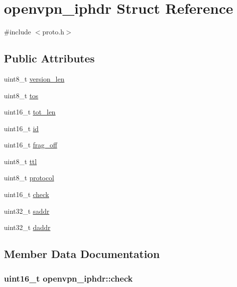 \hypertarget{structopenvpn__iphdr}{}\section{openvpn\+\_\+iphdr Struct Reference}
\label{structopenvpn__iphdr}


{\ttfamily \#include $<$proto.\+h$>$}

\subsection*{Public Attributes}
\begin{DoxyCompactItemize}
\item 
uint8\+\_\+t \hyperlink{structopenvpn__iphdr_af3c74339e4e6ab5c8edbb5b8d1ab3fa6}{version\+\_\+len}
\item 
uint8\+\_\+t \hyperlink{structopenvpn__iphdr_a7d9f9091a70b79f109b955d1847f0cdd}{tos}
\item 
uint16\+\_\+t \hyperlink{structopenvpn__iphdr_a85f8dfbea42552b0b223ea33e631e00f}{tot\+\_\+len}
\item 
uint16\+\_\+t \hyperlink{structopenvpn__iphdr_a6194466018f8cb66d48d5cf24f10eafc}{id}
\item 
uint16\+\_\+t \hyperlink{structopenvpn__iphdr_a16d58a2f6f08ba155fbcfe917481f24b}{frag\+\_\+off}
\item 
uint8\+\_\+t \hyperlink{structopenvpn__iphdr_ac44b0a0f71994e78650cd99ef5fff6f4}{ttl}
\item 
uint8\+\_\+t \hyperlink{structopenvpn__iphdr_a80991f47f7829586d8f04ab15e32887b}{protocol}
\item 
uint16\+\_\+t \hyperlink{structopenvpn__iphdr_aaf20d2d6bbc29e93131ec46435339618}{check}
\item 
uint32\+\_\+t \hyperlink{structopenvpn__iphdr_a0fc77e795ef1ceba80104f1b75c89e40}{saddr}
\item 
uint32\+\_\+t \hyperlink{structopenvpn__iphdr_a221baaf37b3b32e107f1300686529b55}{daddr}
\end{DoxyCompactItemize}


\subsection{Member Data Documentation}
\hypertarget{structopenvpn__iphdr_aaf20d2d6bbc29e93131ec46435339618}{}
\subsubsection[{check}]{\setlength{\rightskip}{0pt plus 5cm}uint16\+\_\+t openvpn\+\_\+iphdr\+::check}\label{structopenvpn__iphdr_aaf20d2d6bbc29e93131ec46435339618}
\hypertarget{structopenvpn__iphdr_a221baaf37b3b32e107f1300686529b55}{}
